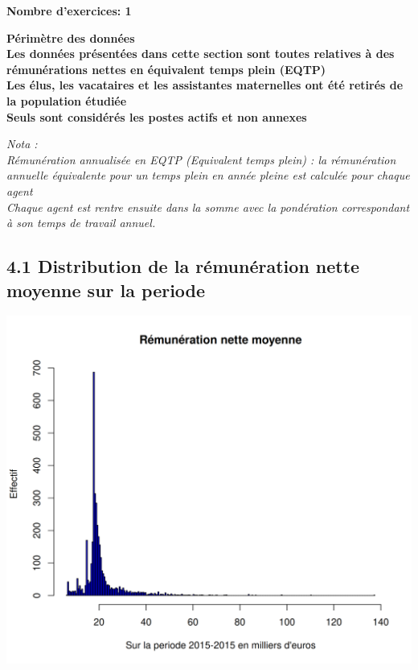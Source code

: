 \textbf{Nombre d'exercices: 1 }

\textbf{Périmètre des données}\\
\textbf{Les données présentées dans cette section sont toutes relatives
à des rémunérations nettes en équivalent temps plein (EQTP)}\\
\textbf{Les élus, les vacataires et les assistantes maternelles ont été
retirés de la population étudiée}\\
\textbf{Seuls sont considérés les postes actifs et non annexes}

\emph{Nota :}\\
\emph{Rémunération annualisée en EQTP (Equivalent temps plein) : la
rémunération annuelle équivalente pour un temps plein en année pleine
est calculée pour chaque agent}\\
\emph{Chaque agent est rentre ensuite dans la somme avec la pondération
correspondant à son temps de travail annuel. }

\hypertarget{distribution-de-la-remuneration-nette-moyenne-sur-la-periode}{%
\subsection{4.1 Distribution de la rémunération nette moyenne sur la
periode}\label{distribution-de-la-remuneration-nette-moyenne-sur-la-periode}}

\includegraphics{altair_files/figure-latex/unnamed-chunk-115-1.png}

